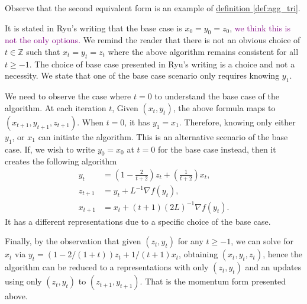 \documentclass[12pt]{article}
\begin{document}
        \begin{observation}
            Observe that the second equivalent form is an example of \hyperref[def:agg_tri]{definition \ref*{def:agg_tri}}. 
            \par\noindent
            It is stated in Ryu's writing that the base case is $x_0 = y_0 = z_0$, 
            \textcolor{purple}{we think this is not the only options.} 
            We remind the reader that there is not an obvious choice of $t\in \mathbb Z$ such that $x_t = y_t = z_t$ where the above algorithm remains consistent for all $t \ge -1$. 
            The choice of base case presented in Ryu's writing is a choice and not a necessity. 
            We state that one of the base case scenario only requires knowing $y_1$. 

            \par\noindent 
            We need to observe the case where $t = 0$ to understand the base case of the algorithm. 
            At each iteration $t$, Given $(x_t, y_t)$, the above formula maps to $(x_{t + 1}, y_{t + 1}, z_{t + 1})$. 
            When $t= 0$, it has $y_1 = x_1$. 
            Therefore, knowing only either $y_1$, or $x_1$ can initiate the algorithm. 
            This is an alternative scenario of the base case. 
            If, we wish to write $y_0 = x_0$ at $t = 0$ for the base case instead, then it creates the following algorithm 
            \begin{align*}
                y_{t} &= \left(
                1 - \frac{2}{t + 2} 
                \right)z_{t} + 
                \left(
                    \frac{1}{t + 2}
                \right)x_{t}, 
                \\
                z_{t + 1} &= y_t + L^{-1}\nabla f(y_t), 
                \\
                x_{t + 1} &= x_t + (t + 1)(2L)^{-1}\nabla f(y_t). 
            \end{align*}
            It has a different representations due to a specific choice of the base case. 
            \par\noindent
            Finally, by the observation that given $(z_t, y_t)$ for any $t\ge -1$, we can solve for $x_t$ \newline via $y_t = (1 - 2/(1 + t))z_t + 1/(t + 1)x_t$, obtaining $(x_t, y_t, z_t)$, hence the algorithm can be reduced to a representations with only $(z_t, y_t)$ and an updates using only $(z_t, y_t)$ to $(z_{t + 1}, y_{t + 1})$. 
            That is the momentum form presented above. 


        \end{observation}
\end{document}
